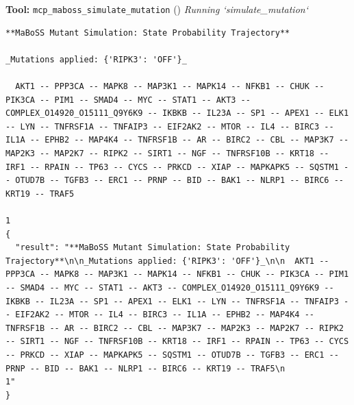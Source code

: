 \documentclass[11pt,a4paper]{article}
\begin{document}
\begin{toolokbox}
\textbf{Tool:} \texttt{mcp\_maboss\_simulate\_mutation} (\checkmark)
\textit{Running `simulate\_mutation`}
\begin{lstlisting}
**MaBoSS Mutant Simulation: State Probability Trajectory**

_Mutations applied: {'RIPK3': 'OFF'}_

  AKT1 -- PPP3CA -- MAPK8 -- MAP3K1 -- MAPK14 -- NFKB1 -- CHUK -- PIK3CA -- PIM1 -- SMAD4 -- MYC -- STAT1 -- AKT3 -- COMPLEX_O14920_O15111_Q9Y6K9 -- IKBKB -- IL23A -- SP1 -- APEX1 -- ELK1 -- LYN -- TNFRSF1A -- TNFAIP3 -- EIF2AK2 -- MTOR -- IL4 -- BIRC3 -- IL1A -- EPHB2 -- MAP4K4 -- TNFRSF1B -- AR -- BIRC2 -- CBL -- MAP3K7 -- MAP2K3 -- MAP2K7 -- RIPK2 -- SIRT1 -- NGF -- TNFRSF10B -- KRT18 -- IRF1 -- RPAIN -- TP63 -- CYCS -- PRKCD -- XIAP -- MAPKAPK5 -- SQSTM1 -- OTUD7B -- TGFB3 -- ERC1 -- PRNP -- BID -- BAK1 -- NLRP1 -- BIRC6 -- KRT19 -- TRAF5
                                                                                                                                                                                                                                                                                                                                                                                                                                                                                                                                                                   1
{
  "result": "**MaBoSS Mutant Simulation: State Probability Trajectory**\n\n_Mutations applied: {'RIPK3': 'OFF'}_\n\n  AKT1 -- PPP3CA -- MAPK8 -- MAP3K1 -- MAPK14 -- NFKB1 -- CHUK -- PIK3CA -- PIM1 -- SMAD4 -- MYC -- STAT1 -- AKT3 -- COMPLEX_O14920_O15111_Q9Y6K9 -- IKBKB -- IL23A -- SP1 -- APEX1 -- ELK1 -- LYN -- TNFRSF1A -- TNFAIP3 -- EIF2AK2 -- MTOR -- IL4 -- BIRC3 -- IL1A -- EPHB2 -- MAP4K4 -- TNFRSF1B -- AR -- BIRC2 -- CBL -- MAP3K7 -- MAP2K3 -- MAP2K7 -- RIPK2 -- SIRT1 -- NGF -- TNFRSF10B -- KRT18 -- IRF1 -- RPAIN -- TP63 -- CYCS -- PRKCD -- XIAP -- MAPKAPK5 -- SQSTM1 -- OTUD7B -- TGFB3 -- ERC1 -- PRNP -- BID -- BAK1 -- NLRP1 -- BIRC6 -- KRT19 -- TRAF5\n                                                                                                                                                                                                                                                                                                                                                                                                                                                                                                                                                                   1"
}
\end{lstlisting}
\end{toolokbox}
\end{document}
